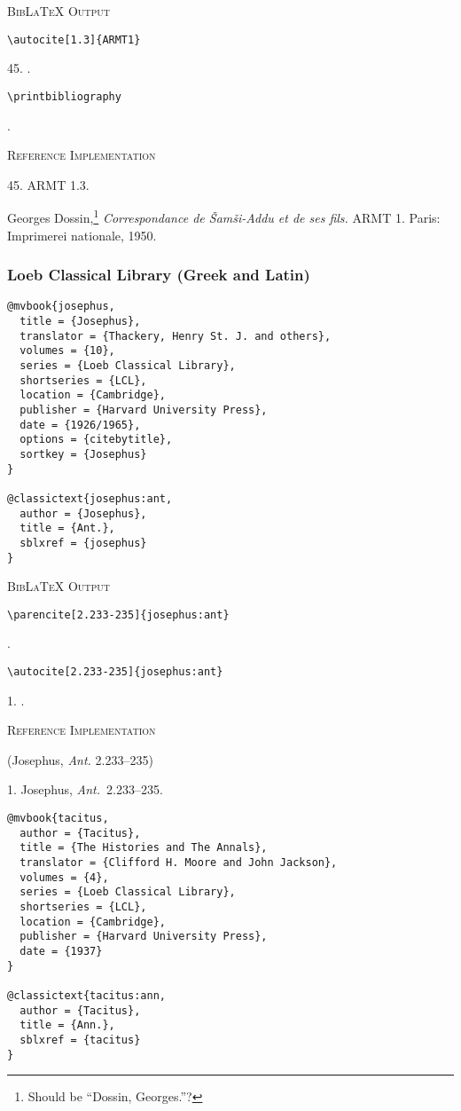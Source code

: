 \documentclass[a4paper]{article}
\newcommand\citetestns[3]{%
  {\textsc{BibLaTeX Output}\par
   \nobreak
   \texttt{\textbackslash autocite[#2]\{#3\}}\par
   \color{biblatex-colour}
   #1. \cite[#2]{#3}.\par
   \color{black}
   \texttt{\textbackslash printbibliography}\par
   \color{biblatex-colour}
   \sloppy\hangindent\bibindent\bibentrycite{#3}.\par}}
\newenvironment{refimp}{%
  \begin{minipage}{\linewidth}
    \setlength{\parskip}{1ex}
    \textsc{Reference Implementation}\par
    \nobreak
    \color{reference-colour}
}{\end{minipage}}
\begin{document}
\citetestns{45}{1.3}{ARMT1}

\begin{refimp}
  45. ARMT 1.3.

  \hangindent\bibindent Georges Dossin,\footnote{Should be “Dossin,
  Georges.”?} \emph{Correspondance de Šamši-Addu et de ses fils.} ARMT 1.
  Paris: Imprimerei nationale, 1950.
\end{refimp}

\subsubsection{Loeb Classical Library (Greek and Latin)}

\begin{lstlisting}
@mvbook{josephus,
  title = {Josephus},
  translator = {Thackery, Henry St. J. and others},
  volumes = {10},
  series = {Loeb Classical Library},
  shortseries = {LCL},
  location = {Cambridge},
  publisher = {Harvard University Press},
  date = {1926/1965},
  options = {citebytitle},
  sortkey = {Josephus}
}

@classictext{josephus:ant,
  author = {Josephus},
  title = {Ant.},
  sblxref = {josephus}
}
\end{lstlisting}

{\textsc{BibLaTeX Output}\par
  \nobreak
  \texttt{\textbackslash parencite[2.233-235]\{josephus:ant\}}\par
  \color{biblatex-colour}
  \parencite[2.233-235]{josephus:ant}.\par
  \color{black}
  \texttt{\textbackslash autocite[2.233-235]\{josephus:ant\}}\par
  \color{biblatex-colour}
1. \cite[2.233-235]{josephus:ant}.\par}

\begin{refimp}
  (Josephus, \emph{Ant.} 2.233–235)

  1. Josephus, \emph{Ant.}\ 2.233–235.
\end{refimp}

\begin{lstlisting}
@mvbook{tacitus,
  author = {Tacitus},
  title = {The Histories and The Annals},
  translator = {Clifford H. Moore and John Jackson},
  volumes = {4},
  series = {Loeb Classical Library},
  shortseries = {LCL},
  location = {Cambridge},
  publisher = {Harvard University Press},
  date = {1937}
}

@classictext{tacitus:ann,
  author = {Tacitus},
  title = {Ann.},
  sblxref = {tacitus}
}
\end{lstlisting}
\end{document}

